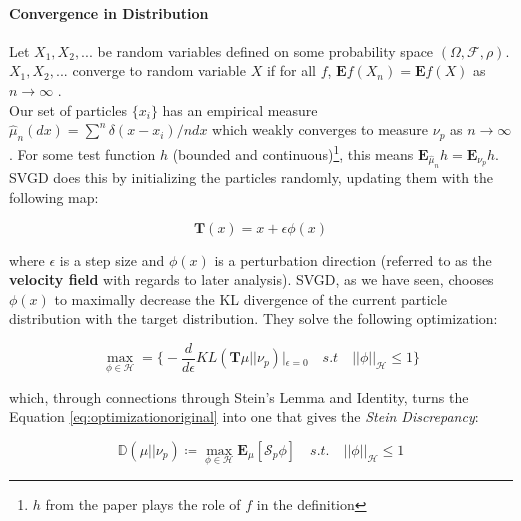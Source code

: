 \documentclass[12pt]{article}
\begin{document}
\paragraph{Convergence in Distribution} Let $X_1, X_2, ...$ be random variables defined on some probability space $(\Omega, \mathcal{F}, \rho)$. $X_1, X_2, ...$ converge to random variable $X$ if for all $f$, $\mathbf{E}f(X_n) = \mathbf{E}f(X)$ as $n \rightarrow \infty$ \cite{encycloconvergencedistribution}.\\ 


\noindent Our set of particles $\{ x_i \}$ has an empirical measure $\hat \mu_n(dx) = \sum^n \delta(x - x_i)/ndx$ which weakly converges to measure $\nu_p$ as $n \rightarrow \infty$. For some test function $h$ (bounded and continuous)\footnote{$h$ from the paper plays the role of $f$ in the definition}, this means $\mathbf{E}_{\hat\mu_n}h = \mathbf{E}_{\nu_p}h$. \\

\noindent SVGD \cite{liu2016stein} does this by initializing the particles randomly, updating them with the following map:

\begin{equation}
    \mathbf{T}(x) = x + \epsilon \phi(x)
    \label{eq:transform}
\end{equation}

\noindent where $\epsilon$ is a step size and $\phi(x)$ is a perturbation direction (referred to as the \textbf{velocity field} with regards to later analysis). SVGD, as we have seen, chooses $\phi(x)$ to maximally decrease the KL divergence of the current particle distribution with the target distribution. They solve the following optimization:

\begin{equation}
    \max_{\phi \in \mathcal{H}} = \Bigg\{ -\frac{d}{d\epsilon} KL(\mathbf{T}\mu || \nu_p) |_{\epsilon = 0} \quad s.t \quad  ||\phi||_\mathcal{H} \leq 1 \Bigg\}
    \label{eq:optimizationoriginal}
\end{equation}

\noindent which, through connections through Stein's Lemma and Identity, turns the Equation \ref{eq:optimizationoriginal} into one that gives the \textit{Stein Discrepancy}: 

\begin{equation}
\mathbb{D}(\mu || \nu_p) \coloneqq \max_{\phi \in \mathcal{H}}\mathbf{E}_\mu [\mathcal{S}_p\phi] \quad s.t. \quad ||\phi||_\mathcal{H} \leq 1 
\end{equation}
\end{document}
